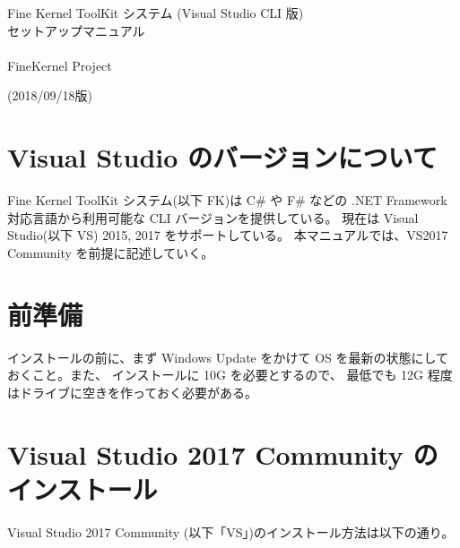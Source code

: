 \documentclass[a4paper]{jsarticle}
\begin{document}
\begin{center}
\begin{Large}
Fine Kernel ToolKit システム (Visual Studio CLI 版) \\
	セットアップマニュアル \\ ~ \\
FineKernel Project \\
\end{Large}
(2018/09/18版)
\end{center}

\section{Visual Studio のバージョンについて}
Fine Kernel ToolKit システム(以下 FK)は 
C\# や F\# などの .NET Framework 対応言語から利用可能な CLI バージョンを提供している。
現在は Visual Studio(以下 VS) 2015, 2017 をサポートしている。
本マニュアルでは、VS2017 Community を前提に記述していく。

\section{前準備}

インストールの前に、まず Windows Update をかけて
OS を最新の状態にしておくこと。また、
インストールに 10G を必要とするので、
最低でも 12G 程度はドライブに空きを作っておく必要がある。

\section{Visual Studio 2017 Community のインストール}
Visual Studio 2017 Community (以下「VS」)のインストール方法は以下の通り。
\end{document}
